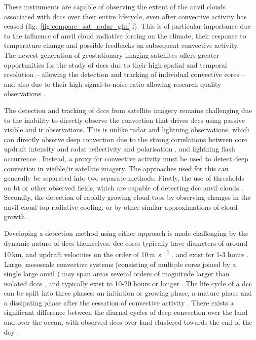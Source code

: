 These instruments are capable of observing the extent of the anvil clouds associated with \acrshort{dcc}s over their entire lifecycle, even after convective activity has ceased (fig.~\ref{fig:compare_sat_radar_glm}\,f).
This is of particular importance due to the influence of anvil cloud radiative forcing on the climate, their response to temperature change \citep{bony_thermodynamic_2016, hartmann_tropical_2016, ceppi_cloud_2017, gasparini_what_2019} and possible feedbacks on subsequent convective activity.
The newest generation of geostationary imaging satellites offers greater opportunities for the study of \acrshort{dcc}s due to their high spatial and temporal resolution -- allowing the detection and tracking of individual convective cores \citep{heikenfeld_tobac_2019} -- and also due to their high signal-to-noise ratio allowing research quality observations \citep{iacovazzi_goes-16_2020}.

The detection and tracking of \acrshort{dcc}s from satellite imagery remains challenging due to the inability to directly observe the convection that drives \acrshort{dcc}s using passive visible and \acrshort{ir} observations.
This is unlike radar and lightning observations, which can directly observe deep convection due to the strong correlations between core updraft intensity and radar reflectivity and polarisation \citep{austin_relation_1987,  zipser_vertical_1994},  and lightning flash occurrence \citep{williams_relationship_1989}.
Instead, a proxy for convective activity must be used to detect deep convection in visible/\acrshort{ir} satellite imagery.
The approaches used for this can generally be separated into two separate methods. 
Firstly, the use of thresholds on \acrshort{bt} or other observed fields, which are capable of detecting \acrshort{dcc} anvil clouds \citep[e.g.][]{schmetz_monitoring_1997, hong_detection_2005, schroder_deep_2009}.
Secondly, the detection of rapidly growing cloud tops by observing changes in the anvil cloud-top radiative cooling, or by other similar approximations of cloud growth \citep{zinner_cb-tram_2008, bedka_objective_2010}.

Developing a detection method using either approach is made challenging by the dynamic nature of \acrshort{dcc}s themselves.
\acrshort{dcc} cores typically have diameters of around 10\,\unit{km}, and updraft velocities on the order of 10\,\unit{m s\textsuperscript{-1}} \citep{weisman_mesoscale_2015}, and exist for 1-3 hours \citep{chen_diurnal_1997}.
Large, mesoscale convective systems (consisting of multiple cores joined by a single large anvil \citep{roca_simple_2017}) may span areas several orders of magnitude larger than isolated \acrshort{dcc}s \citep{houze_mesoscale_2004}, and typically exist to 10-20 hours or longer \citep{chen_diurnal_1997}.
The life cycle of a \acrshort{dcc} can be split into three phases: an initiation or growing phase, a mature phase and a dissipating phase after the cessation of convective activity \citep{wall_life_2018}.
There exists a significant difference between the diurnal cycles of deep convection over the land and over the ocean, with observed \acrshort{dcc}s over land clustered towards the end of the day \citep{taylor_evaluating_2017}.


